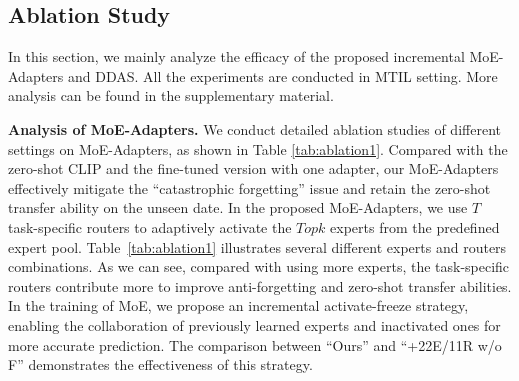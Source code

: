 

\subsection{Ablation Study}
\label{ablation}
In this section, we mainly analyze the efficacy of the proposed incremental MoE-Adapters and DDAS. All the experiments are conducted in MTIL setting. More analysis can be found in the supplementary material.   

\noindent\textbf{Analysis of MoE-Adapters.}
We conduct detailed ablation studies of different settings on MoE-Adapters, as shown in Table \ref{tab:ablation1}. Compared with the zero-shot CLIP and the fine-tuned version with one adapter, our MoE-Adapters effectively mitigate the ``catastrophic forgetting'' issue and retain the zero-shot transfer ability on the unseen date. In the proposed MoE-Adapters, we use $T$ task-specific routers to adaptively activate the $Topk$ experts from the predefined expert pool. Table~\ref{tab:ablation1} illustrates several different experts and routers combinations. As we can see, compared with using more experts, the task-specific routers contribute more to improve anti-forgetting and zero-shot transfer abilities. In the training of MoE, we propose an incremental activate-freeze strategy, enabling the collaboration of previously learned experts and inactivated ones for more accurate prediction. The comparison between ``Ours'' and ``+22E/11R w/o F'' demonstrates the effectiveness of this strategy.  

%


